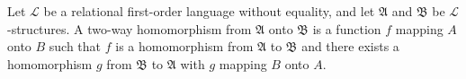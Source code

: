 Let $\mathcal{L}$ be a relational first-order language without equality, and let $\mathfrak{A}$ and $\mathfrak{B}$ be $\mathcal{L}$-structures. A two-way homomorphism from $\mathfrak{A}$ onto $\mathfrak{B}$ is a function $f$ mapping $A$ onto $B$ such that $f$ is a homomorphism from $\mathfrak{A}$ to $\mathfrak{B}$ and there exists a homomorphism $g$ from $\mathfrak{B}$ to $\mathfrak{A}$ with $g$ mapping $B$ onto $A$.

